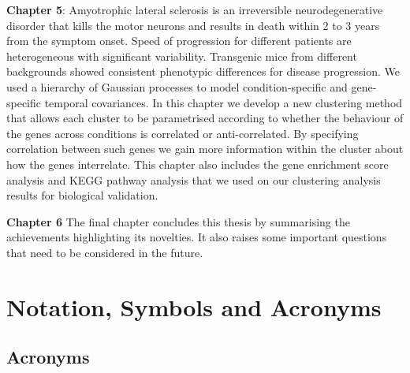 \textbf{Chapter 5}:
Amyotrophic lateral sclerosis is an irreversible neurodegenerative disorder that kills the motor neurons and results in death within 2 to 3 years from the symptom onset.  Speed of progression for different patients are heterogeneous with significant variability. Transgenic mice from different backgrounds showed consistent phenotypic differences for disease progression. We used a hierarchy of Gaussian processes to model condition-specific and gene-specific temporal covariances. In this chapter we develop a new clustering method that allows each cluster to be parametrised according to whether the behaviour of the genes across conditions is correlated or anti-correlated. By specifying correlation between such genes we gain more information within the cluster about how the genes interrelate. This chapter also includes the gene enrichment score analysis and KEGG pathway analysis that we used on our clustering analysis results for biological validation.

\textbf{Chapter 6}
The final chapter concludes this thesis by summarising the achievements highlighting its novelties. It also raises some important questions that need to be considered in the future.

\section{Notation, Symbols and Acronyms}

\subsection{Acronyms}


